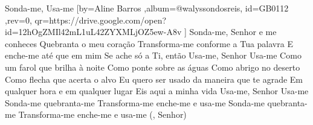 \beginsong
{Sonda-me, Usa-me %
}[by={Aline Barros %
},album={@walyssondosreis},
id={GB0112 %
},rev={0}, %
qr={https://drive.google.com/open?id=12hOgZMIl42mL1uL42ZYXMLjOZ5ew-A8v %
}]
\beginverse*
Sonda-me, Senhor e me conheces
Quebranta o meu coração
Transforma-me conforme a Tua palavra
E enche-me até que em mim
Se ache só a Ti, então
Usa-me, Senhor
Usa-me
\endverse
\beginchorus
Como um farol que brilha à noite
Como ponte sobre as águas
Como abrigo no deserto
Como flecha que acerta o alvo
Eu quero ser usado da maneira que te agrade
Em qualquer hora e em qualquer lugar
Eis aqui a minha vida
Usa-me, Senhor
Usa-me
\endchorus
\beginverse*
Sonda-me quebranta-me
Transforma-me enche-me e usa-me
Sonda-me quebranta-me
Transforma-me enche-me e usa-me (, Senhor)
\endverse
\vspace{4em} %
\begin{comment}
\lstset{basicstyle=\scriptsize\bf} %
\tab{Solo 1}
\begin{lstlisting}
E|-----------------------------------------------------|
B|-----------------------------------------------------|
G|-----------------------------------------------------|
D|-----------------------------------------------------|
A|-----------------------------------------------------|
E|-----------------------------------------------------|
\end{lstlisting}
\end{comment}
 
